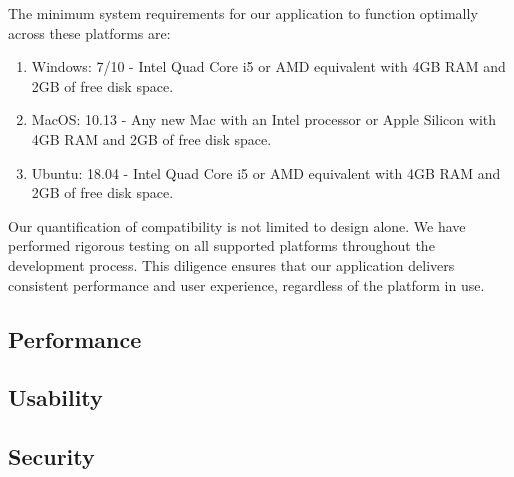 \documentclass[11pt,a4paper]{article}
\begin{document}
The minimum system requirements for our application to function optimally across
these platforms are:

\begin{enumerate}
  \item Windows: 7/10 - Intel Quad Core i5 or AMD equivalent with 4GB RAM and
  2GB of free disk space.
  \item MacOS: 10.13 - Any new Mac with an Intel processor or Apple Silicon with
  4GB RAM and 2GB of free disk space.
  \item Ubuntu: 18.04 - Intel Quad Core i5 or AMD equivalent with 4GB RAM and
  2GB of free disk space.
\end{enumerate}

Our quantification of compatibility is not limited to design alone. We have
performed rigorous testing on all supported platforms throughout the development
process. This diligence ensures that our application delivers consistent
performance and user experience, regardless of the platform in use.

\subsection*{Performance}

\subsection*{Usability}


\subsection*{Security}
\end{document}

